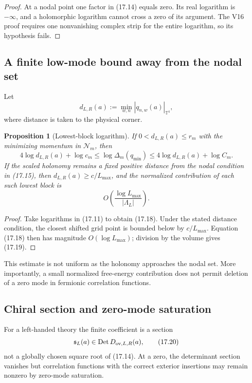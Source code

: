 \documentclass[11pt]{article}
\newtheorem{proposition}[theorem]{Proposition}
\newcommand{\Det}{\operatorname{Det}}
\begin{document}
\begin{proof}
At a nodal point one factor in (17.14) equals zero.  Its real logarithm is
\(-\infty\), and a holomorphic logarithm cannot cross a zero of its
argument.  The V16 proof requires one nonvanishing complex strip for the
entire logarithm, so its hypothesis fails.
\end{proof}

\subsection{A finite low-mode bound away from the nodal set}

Let
\[
 d_{L,R}(a)
 :=
 \min_{w,n}
 \left|
 q_{n,w}(a)
 \right|_{\mathbb T^4},
 \tag{17.17}
\]
where distance is taken to the physical corner.

\begin{proposition}[Lowest-block logarithm]
\label{prop:v11v17-low-log}
If \(0<d_{L,R}(a)\leq r_m\) with the minimizing momentum in
\(\mathcal N_m\), then
\[
 4\log d_{L,R}(a)+\log c_m
 \leq
 \log\Delta_m(q_{\min})
 \leq
 4\log d_{L,R}(a)+\log C_m.
 \tag{17.18}
\]
If the scaled holonomy remains a fixed positive distance from the nodal
condition in (17.15), then
\(d_{L,R}(a)\geq c/L_{\max}\), and the normalized contribution of each
such lowest block is
\[
 O\left(\frac{\log L_{\max}}{|\Lambda_L|}\right).
 \tag{17.19}
\]
\end{proposition}

\begin{proof}
Take logarithms in (17.11) to obtain (17.18).  Under the stated distance
condition, the closest shifted grid point is bounded below by
\(c/L_{\max}\).  Equation (17.18) then has magnitude \(O(\log L_{\max})\);
division by the volume gives (17.19).
\end{proof}

This estimate is not uniform as the holonomy approaches the nodal set.
More importantly, a small normalized free-energy contribution does not
permit deletion of a zero mode in fermionic correlation functions.

\subsection{Chiral section and zero-mode saturation}

For a left-handed theory the finite coefficient is a section
\[
 \mathfrak s_L(a)\in\Det D_{{\rm ov},L,R}(a),
 \tag{17.20}
\]
not a globally chosen square root of (17.14).  At a zero, the determinant
section vanishes but correlation functions with the correct exterior
insertions may remain nonzero by zero-mode saturation.
\end{document}
